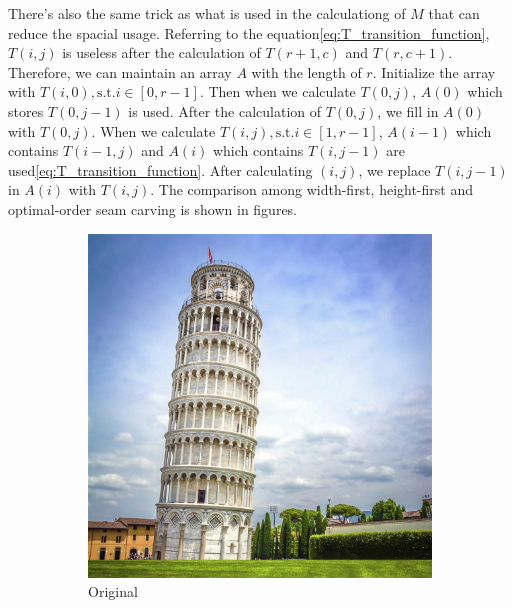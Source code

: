 \documentclass[final]{cvpr}
\begin{document}
There's also the same trick as what is used in the calculationg of $M$ that can reduce the spacial usage.
Referring to the equation\ref{eq:T_transition_function}, $T(i,j)$ is useless after the calculation of $T(r+1,c)$ and $T(r,c+1)$.
Therefore, we can maintain an array $A$ with the length of $r$.
Initialize the array with $T(i,0),\text{s.t.}i\in[0,r-1]$.
Then when we calculate $T(0,j)$, $A(0)$ which stores $T(0,j-1)$ is used.
After the calculation of $T(0,j)$, we fill in $A(0)$ with $T(0,j)$.
When we calculate $T(i,j),\text{s.t.}i\in[1,r-1]$, $A(i-1)$ which contains $T(i-1,j)$ and $A(i)$ which contains $T(i,j-1)$ are used\ref{eq:T_transition_function}.
After calculating $(i,j)$, we replace $T(i,j-1)$ in $A(i)$ with $T(i,j)$.
The comparison among width-first, height-first and optimal-order seam carving is shown in figures.
\begin{figure}[htb]
\begin{center}
\begin{subfigure}[b]{0.7\linewidth}
    \includegraphics[width=\textwidth]{pisa.jpg}
    \caption{Original}
\end{subfigure}
\begin{subfigure}[b]{0.30\linewidth}

\end{subfigure}
\end{center}
\end{figure}
\end{document}
